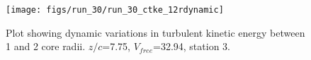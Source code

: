 \begin{figure}[H]
\centering
\texttt{[image: figs/run\_30/run\_30\_ctke\_12rdynamic]}
\caption{Plot showing dynamic variations in turbulent kinetic energy between 1 and 2 core radii. $z/c$=7.75, $V_{free}$=32.94, station 3.}
\label{fig:run_30_ctke_12rdynamic}
\end{figure}


